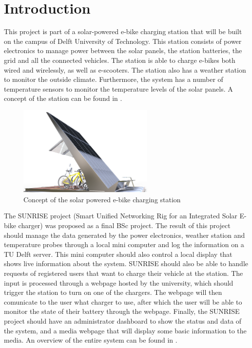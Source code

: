 \section{Introduction}\label{sec:introduction}
This project is part of a solar-powered e-bike charging station that will be built on the campus of Delft University of Technology. This station consists of power electronics to manage power between the solar panels, the station batteries, the grid and all the connected vehicles. The station is able to charge e-bikes both wired and wirelessly, as well as e-scooters. The station also has a weather station to monitor the outside climate. Furthermore, the system has a number of temperature sensors to monitor the temperature levels of the solar panels. A concept of the station can be found in .

\begin{figure}[!ht]
  \centering
    \includegraphics[width=0.6\textwidth]{images/charging_station.png}
      \caption{Concept of the solar powered e-bike charging station \cite{feasibility_study}}\label{fig:station_concept}
\end{figure}

The SUNRISE project (Smart Unified Networking Rig for an Integrated Solar E-bike charger) was proposed as a final BSc project. The result of this project should manage the data generated by the power electronics, weather station and temperature probes through a local mini computer and log the information on a TU Delft server. This mini computer should also control a local display that shows live information about the system. SUNRISE should also be able to handle requests of registered users that want to charge their vehicle at the station. The input is processed through a webpage hosted by the university, which should trigger the station to turn on one of the chargers. The webpage will then comunicate to the user what charger to use, after which the user will be able to monitor the state of their battery through the webpage. Finally, the SUNRISE project should have an administrator dashboard to show the status and data of the system, and a media webpage that will display some basic information to the media. An overview of the entire system can be found in .


